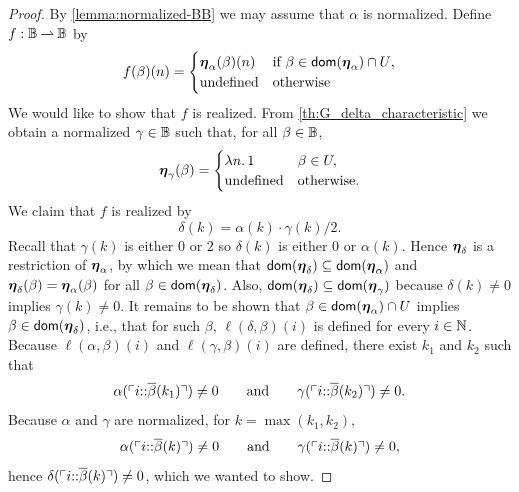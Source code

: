 \begin{proof}
  By \cref{lemma:normalized-BB} we may assume that $\alpha$ is normalized.
  Define $f: \mathbb{B} \mathbin{\rightharpoonup} \mathbb{B}$ by
  \begin{equation*}
    f(\beta)(n) =
    \begin{cases}
      \text{\boldmath{$\eta$}}_{\alpha}(\beta)(n) &
      \text{if $\beta \in \mathsf{dom}(\text{\boldmath{$\eta$}}_\alpha) \cap U$,} \\
      \text{undefined} & \text{otherwise}
    \end{cases}
  \end{equation*}
  We would like to show that $f$ is realized. From \cref{th:G_delta_characteristic} we obtain a normalized $\gamma \in \mathbb{B}$ such that, for all $\beta \in \mathbb{B}$,
  \begin{equation*}
    \text{\boldmath{$\eta$}}_{\gamma}(\beta) =
    \begin{cases}
      \lambda n .\,1 & \beta \in U,\\
      \text{undefined} & \text{otherwise}.
    \end{cases}
  \end{equation*}
  We claim that $f$ is realized by
  \begin{equation*}
    \delta(k) = \alpha(k) \cdot \gamma(k)/2.
  \end{equation*}
  Recall that $\gamma(k)$ is either $0$ or $2$ so $\delta(k)$ is
  either $0$ or $\alpha(k)$. Hence $\text{\boldmath{$\eta$}}_\delta$ is a restriction of
  $\text{\boldmath{$\eta$}}_\alpha$, by which we mean that $\mathsf{dom}(\text{\boldmath{$\eta$}}_\delta) \subseteq
  \mathsf{dom}(\text{\boldmath{$\eta$}}_\alpha)$ and $\text{\boldmath{$\eta$}}_{\delta}(\beta) = \text{\boldmath{$\eta$}}_{\alpha}(\beta)$
  for all $\beta \in \mathsf{dom}(\text{\boldmath{$\eta$}}_\delta)$. Also, $\mathsf{dom}(\text{\boldmath{$\eta$}}_\delta)
  \subseteq \mathsf{dom}(\text{\boldmath{$\eta$}}_\gamma)$ because $\delta(k) \neq 0$ implies
  $\gamma(k) \neq 0$. It remains to be shown that $\beta \in
  \mathsf{dom}(\text{\boldmath{$\eta$}}_\alpha) \cap U$ implies $\beta \in \mathsf{dom}(\text{\boldmath{$\eta$}}_\delta)$,
  i.e., that for such $\beta$, $\ell(\delta, \beta)(i)$ is
  defined for every $i \in \mathbb{N}$. Because $\ell(\alpha, \beta)(i)$
  and $\ell(\gamma, \beta)(i)$ are
  defined, there exist $k_1$ and $k_2$ such that
  \begin{equation*}
    \alpha(\ulcorner i {:}{:} \overline{\beta}(k_1) \urcorner) \neq 0
    \qquad\text{and}\qquad
    \gamma(\ulcorner i {:}{:} \overline{\beta}(k_2) \urcorner) \neq 0.
  \end{equation*}
  Because $\alpha$ and $\gamma$ are normalized, for $k = \max(k_1,
  k_2)$,
  \begin{equation*}
    \alpha(\ulcorner i {:}{:} \overline{\beta}(k) \urcorner) \neq 0
    \qquad\text{and}\qquad
    \gamma(\ulcorner i {:}{:} \overline{\beta}(k) \urcorner) \neq 0,
  \end{equation*}
  hence $\delta(\ulcorner i {:}{:} \overline{\beta}(k) \urcorner) \neq 0$, which we
  wanted to show.
\end{proof}


